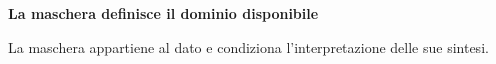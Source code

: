 \documentclass[12pt,aspectratio=1610]{beamer}
\begin{document}
\begin{frame}[plain]\hypertarget{slide20}{}
\begin{lrbox}{\TitleBox}
\begin{minipage}[t]{17.7cm}\raggedright\color{Ink}\fontsize{11.3}{14.8}\selectfont
\color{Navy}\bfseries\fontsize{20.6}{24.5}\selectfont La maschera definisce il dominio disponibile
\end{minipage}\end{lrbox}

\begin{lrbox}{\RecallBox}
\begin{minipage}[t]{14.3cm}\raggedright\color{Ink}\fontsize{11.3}{14.8}\selectfont
\fontsize{10.3}{13.8}\selectfont La maschera appartiene al dato e condiziona l’interpretazione delle sue sintesi.
\end{minipage}\end{lrbox}


\end{frame}
\end{document}
